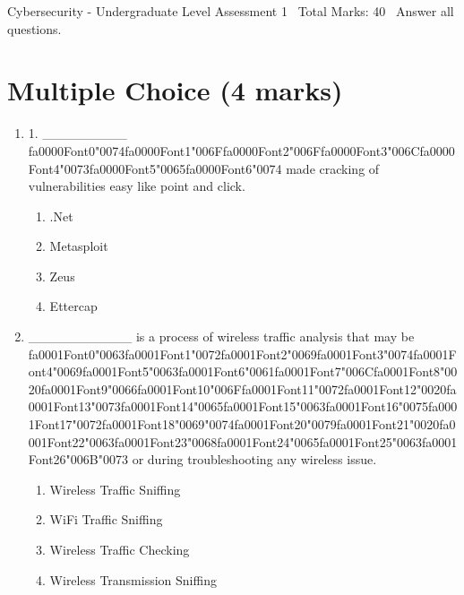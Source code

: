 \documentclass[12pt]{article}
\begin{document}
\begin{center}
Cybersecurity - Undergraduate Level Assessment 1 \
Total Marks: 40 \
Answer all questions.
\end{center}

\section*{Multiple Choice (4 marks)}
\begin{enumerate}[label=\arabic*.]
\item 1. \_\_\_\_\_\_\_\_\_ {\csname fa0000Font0\endcsname\char"0074}{\csname fa0000Font1\endcsname\char"006F}{\csname fa0000Font2\endcsname\char"006F}{\csname fa0000Font3\endcsname\char"006C}{\csname fa0000Font4\endcsname\char"0073}{\csname fa0000Font5\endcsname\char"0065}{\csname fa0000Font6\endcsname\char"0074} made cracking of vulnerabilities easy like point and click.
\begin{enumerate}[label=(\alph*)]
    \item .Net
    \item Metasploit
    \item Zeus
    \item Ettercap
\end{enumerate}
\item \_\_\_\_\_\_\_\_\_\_\_ is a process of wireless traffic analysis that may be {\csname fa0001Font0\endcsname\char"0063}{\csname fa0001Font1\endcsname\char"0072}{\csname fa0001Font2\endcsname\char"0069}{\csname fa0001Font3\endcsname\char"0074}{\csname fa0001Font4\endcsname\char"0069}{\csname fa0001Font5\endcsname\char"0063}{\csname fa0001Font6\endcsname\char"0061}{\csname fa0001Font7\endcsname\char"006C}{\csname fa0001Font8\endcsname\char"0020}{\csname fa0001Font9\endcsname\char"0066}{\csname fa0001Font10\endcsname\char"006F}{\csname fa0001Font11\endcsname\char"0072}{\csname fa0001Font12\endcsname\char"0020}{\csname fa0001Font13\endcsname\char"0073}{\csname fa0001Font14\endcsname\char"0065}{\csname fa0001Font15\endcsname\char"0063}{\csname fa0001Font16\endcsname\char"0075}{\csname fa0001Font17\endcsname\char"0072}{\csname fa0001Font18\endcsname\char"0069}{\char"0074}{\csname fa0001Font20\endcsname\char"0079}{\csname fa0001Font21\endcsname\char"0020}{\csname fa0001Font22\endcsname\char"0063}{\csname fa0001Font23\endcsname\char"0068}{\csname fa0001Font24\endcsname\char"0065}{\csname fa0001Font25\endcsname\char"0063}{\csname fa0001Font26\endcsname\char"006B}{\char"0073} or during troubleshooting any wireless issue.
\begin{enumerate}[label=(\alph*)]
    \item Wireless Traffic Sniffing
    \item WiFi Traffic Sniffing
    \item Wireless Traffic Checking
    \item Wireless Transmission Sniffing
\end{enumerate}
\end{enumerate}
\end{document}
